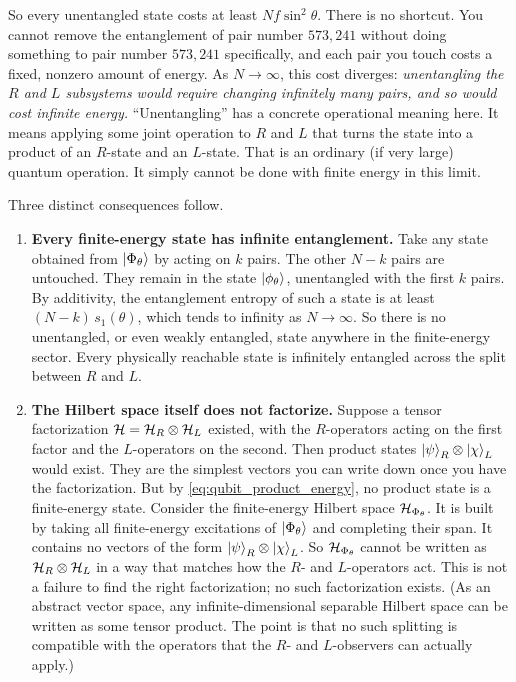 So every unentangled state costs at least $N f\sin^2\theta$. There is no shortcut. You cannot remove the
entanglement of pair number $573{,}241$ without doing something to pair number $573{,}241$ specifically, and
each pair you touch costs a fixed, nonzero amount of energy. As $N\to\infty$, this cost diverges:
\emph{unentangling the $R$ and $L$ subsystems would require changing infinitely many pairs, and so would cost
infinite energy.} ``Unentangling'' has a concrete operational meaning here. It means applying some joint
operation to $R$ and $L$ that turns the state into a product of an $R$-state and an $L$-state. That is an
ordinary (if very large) quantum operation. It simply cannot be done with finite energy in this limit.

Three distinct consequences follow.

\begin{enumerate}
\item \textbf{Every finite-energy state has infinite entanglement.} Take any state obtained from
$\ket{\Phi_\theta}$ by acting on $k$ pairs. The other $N-k$ pairs are untouched. They remain in the state
$\ket{\phi_\theta}$, unentangled with the first $k$ pairs. By additivity, the entanglement entropy of such a
state is at least $(N-k)\,s_1(\theta)$, which tends to infinity as $N\to\infty$. So there is no unentangled,
or even weakly entangled, state anywhere in the finite-energy sector. Every physically reachable state is
infinitely entangled across the split between $R$ and $L$.

\item \textbf{The Hilbert space itself does not factorize.} Suppose a tensor factorization
$\mathcal{H}=\mathcal{H}_R\otimes\mathcal{H}_L$ existed, with the $R$-operators acting on the first factor and the $L$-operators on
the second. Then product states $\ket\psi_R\otimes\ket\chi_L$ would exist. They are the simplest vectors you
can write down once you have the factorization. But by \eqref{eq:qubit_product_energy}, no product state is
a finite-energy state. Consider the finite-energy Hilbert space $\mathcal{H}_{\Phi_\theta}$. It is built by taking all
finite-energy excitations of $\ket{\Phi_\theta}$ and completing their span. It contains no vectors of the form
$\ket\psi_R\otimes\ket\chi_L$. So $\mathcal{H}_{\Phi_\theta}$ cannot be written as $\mathcal{H}_R\otimes\mathcal{H}_L$ in a way that
matches how the $R$- and $L$-operators act. This is not a failure to find the right factorization; no such
factorization exists. (As an abstract vector space, any infinite-dimensional separable Hilbert space can be
written as some tensor product. The point is that no such splitting is compatible with the operators that the
$R$- and $L$-observers can actually apply.)


\end{enumerate}
